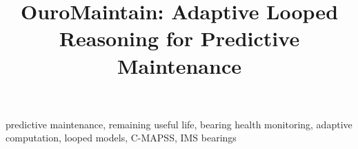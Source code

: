 \documentclass[conference]{IEEEtran}
\title{OuroMaintain: Adaptive Looped Reasoning for Predictive Maintenance}
\author{
\IEEEauthorblockN{Cordell Stonecipher}
\IEEEauthorblockA{Independent Researcher\\
Detroit, Michigan, USA}
}
\begin{document}
\maketitle

\begin{abstract}

\end{abstract}

\begin{IEEEkeywords}
predictive maintenance, remaining useful life, bearing health monitoring, adaptive computation, looped models, C-MAPSS, IMS bearings
\end{IEEEkeywords}















\end{document}
